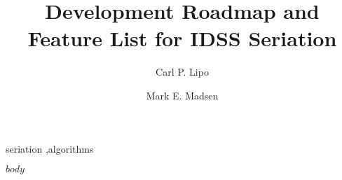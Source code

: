 \documentclass[preprint,times,authoryear,10pt]{elsarticle}
\begin{document}
\begin{frontmatter}


\title{Development Roadmap and Feature List for IDSS Seriation}

\author{Carl P. Lipo}
\address{Department of Anthropology and IIRMES, 1250 Bellflower Blvd, California State University at Long Beach, Long Beach CA, 90840 USA}

\author{Mark E. Madsen}
\address{Department of Anthropology, Box 353100, University of Washington, Seattle WA, 98195 USA}



\begin{keyword}
seriation \sep algorithms
\end{keyword}


\end{frontmatter}

$body$





\end{document}
